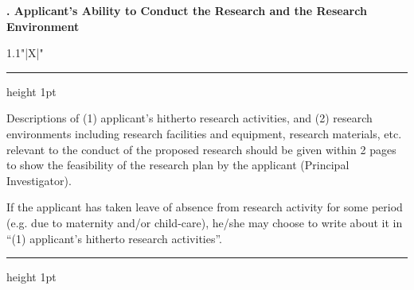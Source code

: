 \documentclass[8pt]{extarticle}
\makeatletter
\newcommand{\thickhline}{%
	\noalign {\ifnum 0=`}\fi \hrule height 1pt
	\futurelet \reserved@a \@xhline
}
\makeatother
\begin{document}
	
\noindent\textbf{\fontsize{12}{12}. Applicant's Ability to Conduct the Research and the Research Environment}\\
\begin{tabularx}{1.1\linewidth}{"|X|"}
	\thickhline
	Descriptions of (1) applicant's hitherto research activities, and (2) research environments including research facilities and equipment, research materials, etc. relevant to the conduct of the proposed research should be given within 2 pages to show the feasibility of the research plan by the applicant (Principal Investigator).
	
	If the applicant has taken leave of absence from research activity for some period (e.g. due to maternity and/or child-care), he/she may choose to write about it in ``(1) applicant's hitherto research activities''.
	\\
	\thickhline
\end{tabularx}
\end{document}
